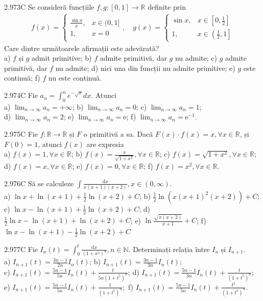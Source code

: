 \documentclass[11pt]{article}
\begin{document}
2.973C Se consideră funcțiile $f, g:[0,1] \rightarrow \mathbb{R}$ definite prin $$\begin{aligned}f(x)=\left\{\begin{array}{ll}\frac{\sin x}{x}, & x \in(0,1] \\1, & x=0\end{array}, \quad g(x)= \begin{cases}\sin x, & x \in\left[0, \frac{1}{2}\right] \\1, & x \in\left(\frac{1}{2}, 1\right]\end{cases} \right.\end{aligned}$$ Care dintre următoarele afirmații este adevărată?\\ a) $f$ și $g$ admit primitive; b) $f$ admite primitivă, dar $g$ nu admite; c) $g$ admite primitivă, dar $f$ nu admite; d) nici una din funcții nu admite primitive; e) $g$ este continuă; f) $f$ nu este continuă.

2.974C Fie $a_{n}=\int_{0}^{n} e^{-\sqrt{x}} d x$. Atunci\\ a) $\lim _{n \rightarrow \infty} a_{n}=+\infty$; b) $\lim _{n \rightarrow \infty} a_{n}=0$; c) $\lim _{n \rightarrow \infty} a_{n}=1$;\\ d) $\lim _{n \rightarrow \infty} a_{n}=2$; e) $\lim _{n \rightarrow \infty} a_{n}=\mathrm{e}$; f) $\lim _{n \rightarrow \infty} a_{n}=\mathrm{e}^{-1}$.

2.975C Fie $f: \mathbb{R} \rightarrow \mathbb{R}$ și $F$ o primitivă a sa. Dacă $F(x) \cdot f(x)=x, \forall x \in \mathbb{R}$, și $F(0)=1$, atunci $f(x)$ are expresia\\ a) $f(x)=1, \forall x \in \mathbb{R}$; b) $f(x)=\frac{x}{\sqrt{1+x^{2}}}, \forall x \in \mathbb{R}$; c) $f(x)=\sqrt{1+x^{2}}, \forall x \in \mathbb{R}$; d) $f(x)=x, \forall x \in \mathbb{R}$; e) $f(x)=0, \forall x \in \mathbb{R}$; f) $f(x)=x^{2}, \forall x \in \mathbb{R}$.

2.976C Să se calculeze $\int \frac{\mathrm{d} x}{x(x+1)(x+2)}, x \in(0, \infty)$.\\ a) $\ln x+\ln (x+1)+\frac{1}{2} \ln (x+2)+C$; b) $\frac{1}{2} \ln \left(x(x+1)^{2}(x+2)\right)+C$;\\ c) $\ln x-\ln (x+1)+\frac{1}{2} \ln (x+2)+C$; d) $\frac{1}{2} \ln x-\ln (x+1)+\ln (x+2)+C$; e) $\ln \frac{\sqrt{x(x+2)}}{x+1}+C$; f) $\ln x-\ln (x+1)-\frac{1}{2} \ln (x+2)+C$

2.977C Fie $I_{n}(t)=\int_{0}^{t} \frac{\mathrm{d} x}{\left(1+x^{5}\right)^{n}}, n \in \mathbb{N}$. Determinați relația între $I_{n}$ și $I_{n+1}$.\\ a) $I_{n+1}(t)=\frac{3 n-1}{2 n} I_{n}(t)$; b) $I_{n+1}(t)=\frac{3 n-1}{3 n} I_{n}(t)$;\\ c) $I_{n+1}(t)=\frac{5 n-1}{5 n} I_{n}(t)+\frac{t}{5 n\left(1+t^{5}\right)^{n}}$; d) $I_{n+1}(t)=\frac{5 n-1}{3 n} I_{n}(t)+\frac{t}{\left(1+t^{5}\right)^{n}}$;\\ e) $I_{n+1}(t)=\frac{5 n-1}{5 n} I_{n}(t)+\frac{1}{\left(1+t^{5}\right)^{n}} ;$ f) $I_{n+1}(t)=\frac{5 n-1}{5 n} I_{n}(t)+\frac{t^{5}}{\left(1+t^{3}\right)^{n}}$.
\end{document}
